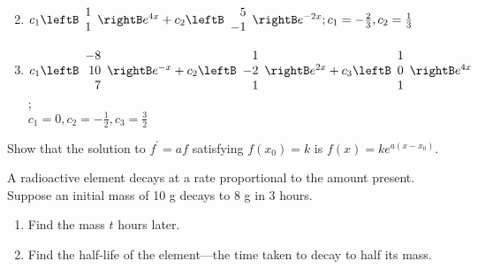 \begin{multicols}{2}
\begin{ex}
\begin{enumerate}[label={\alph*.}]
\end{enumerate}
\begin{sol}
\begin{enumerate}[label={\alph*.}]
\setcounter{enumi}{1}
\item  $c_1 \leftB \begin{array}{r}
1 \\
1
\end{array} \rightB e^{4x} + c_2 \leftB \begin{array}{r}
5 \\
-1
\end{array} \rightB e^{-2x};
c_1 = -\frac{2}{3}, c_2 = \frac{1}{3}$


\setcounter{enumi}{3}
\item   $c_1 \leftB \begin{array}{r}
-8 \\
10 \\
7
\end{array} \rightB e^{-x} + c_2 \leftB \begin{array}{r}
1 \\
-2 \\
1
\end{array} \rightB e^{2x} + c_3 \leftB \begin{array}{r}
1 \\
0 \\
1
\end{array} \rightB e^{4x}$; \\
$c_1 = 0, c_2 = -\frac{1}{2}, c_3=\frac{3}{2}$
\end{enumerate}
\end{sol}
\end{ex}

\begin{ex}
Show that the solution to $f^{\prime}= af$ satisfying $f(x_{0}) = k$ is $f(x) = ke^{a(x-x_0)}$.
\end{ex}

\begin{ex}
A
 radioactive element decays at a rate proportional to the amount 
present. Suppose an initial mass of 10 g decays to 8 g in 3 hours.


\begin{enumerate}[label={\alph*.}]
\item Find the mass $t$ hours later.

\item Find the half-life of the element---the time taken to decay to half its mass.


\end{enumerate}
\end{ex}
\end{multicols}
